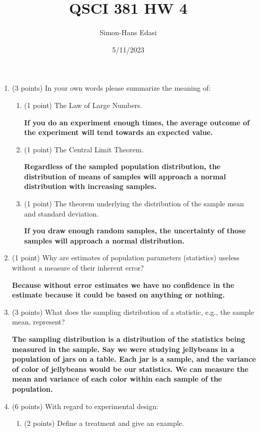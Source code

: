 \documentclass{article}
\title{QSCI 381 HW 4}
\date{5/11/2023}
\author{Simon-Hans Edasi}
\begin{document}
	\maketitle






\begin{enumerate}
\item (3 points) In your own words please summarize the meaning of:
	\begin{enumerate}
	\item (1 point) The Law of Large Numbers.
	
	\textbf{If you do an experiment enough times, the average outcome of the experiment will tend towards an expected value.} \\
	
	\item (1 point) The Central Limit Theorem.
	
	\textbf{Regardless of the sampled population distribution, the distribution of means of samples will approach a normal distribution with increasing samples.} \\
	
	\item (1 point) The theorem underlying the distribution of the sample mean and standard deviation.
	
	\textbf{If you draw enough random samples, the uncertainty of those samples will approach a normal distribution.}
	
	\end{enumerate}

\item (1 point) Why are estimates of population parameters (statistics) useless without a measure of their inherent error?

\textbf{Because without error estimates we have no confidence in the estimate because it could be based on anything or nothing.}

\item (3 points) What does the sampling distribution of a statistic, e.g., the sample mean, represent?

\textbf{The sampling distribution is a distribution of the statistics being measured in the sample. Say we were studying jellybeans in a population of jars on a table. Each jar is a sample, and the variance of color of jellybeans would be our statistics. We can measure the mean and variance of each color within each sample of the population.} \\
\item (6 points) With regard to experimental design:
	\begin{enumerate}
	\item (2 points) Define a treatment and give an example.
	

\end{enumerate}
\end{enumerate}
\end{document}
